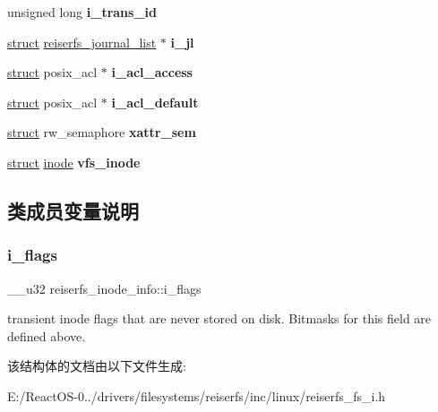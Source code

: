 \begin{DoxyCompactItemize}
\mbox{\label{structreiserfs__inode__info_a232aaec9f80456c189b29326b4c70423}} 
unsigned long {\bfseries i\+\_\+trans\+\_\+id}
\item 
\mbox{\label{structreiserfs__inode__info_ad1a254fe26c2cee7ef823e8a215985ff}} 
\hyperlink{interfacestruct}{struct} \hyperlink{structreiserfs__journal__list}{reiserfs\+\_\+journal\+\_\+list} $\ast$ {\bfseries i\+\_\+jl}
\item 
\mbox{\label{structreiserfs__inode__info_a0838b801dd6b13655f3dfea0d8df2863}} 
\hyperlink{interfacestruct}{struct} posix\+\_\+acl $\ast$ {\bfseries i\+\_\+acl\+\_\+access}
\item 
\mbox{\label{structreiserfs__inode__info_a0e51774724ffe479325f7c3429c75bd6}} 
\hyperlink{interfacestruct}{struct} posix\+\_\+acl $\ast$ {\bfseries i\+\_\+acl\+\_\+default}
\item 
\mbox{\label{structreiserfs__inode__info_abb3ef4fe14d62ea6f51f3bd096b66a36}} 
\hyperlink{interfacestruct}{struct} rw\+\_\+semaphore {\bfseries xattr\+\_\+sem}
\item 
\mbox{\label{structreiserfs__inode__info_a9206d17789076687d2c00a5a1f759ac1}} 
\hyperlink{interfacestruct}{struct} \hyperlink{structinode}{inode} {\bfseries vfs\+\_\+inode}
\end{DoxyCompactItemize}


\subsection{类成员变量说明}
\mbox{\label{structreiserfs__inode__info_a08045363dd99c56bf8a7b66697898e7c}} 
\subsubsection{\texorpdfstring{i\+\_\+flags}{i\_flags}}
{\footnotesize\ttfamily \+\_\+\+\_\+u32 reiserfs\+\_\+inode\+\_\+info\+::i\+\_\+flags}

transient inode flags that are never stored on disk. Bitmasks for this field are defined above. 

该结构体的文档由以下文件生成\+:\begin{DoxyCompactItemize}
\item 
E\+:/\+React\+O\+S-\/0../drivers/filesystems/reiserfs/inc/linux/reiserfs\+\_\+fs\+\_\+i.\+h\end{DoxyCompactItemize}
